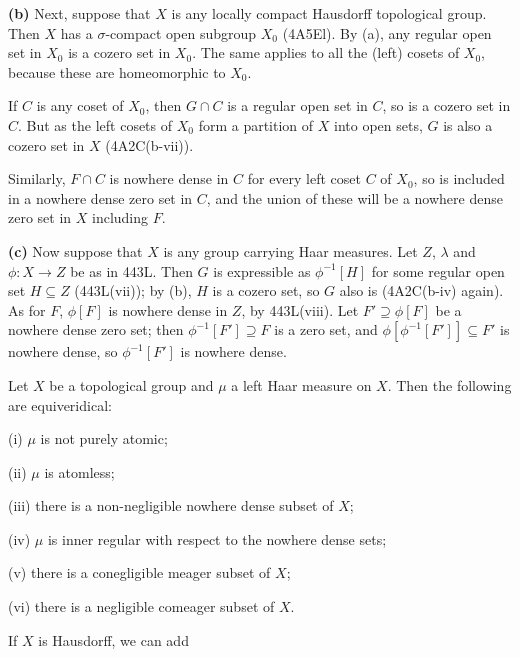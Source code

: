 {\medskip

{\bf (b)} Next, suppose that $X$ is any locally compact Hausdorff
topological group.   Then $X$ has a $\sigma$-compact open subgroup $X_0$
(4A5El).   By (a), any
regular open set in $X_0$ is a cozero set in $X_0$.   The same applies
to all the (left) cosets of $X_0$, because these are homeomorphic to
$X_0$.

If $C$ is any coset
of $X_0$, then $G\cap C$ is a regular open set in $C$, so is a cozero
set in $C$.   But as the left cosets of $X_0$ form a partition of $X$
into open sets, $G$ is also a cozero set in $X$ (4A2C(b-vii)).

Similarly, $F\cap C$ is nowhere dense in $C$ for every left coset $C$ of
$X_0$, so is included in a nowhere dense zero set in $C$, and the union
of these will be a nowhere dense zero set in $X$ including $F$.

\medskip

{\bf (c)} Now suppose that $X$ is any group carrying Haar
measures.   Let $Z$, $\lambda$ and $\phi:X\to Z$ be as in 443L.
Then $G$ is expressible as $\phi^{-1}[H]$ for some regular open set
$H\subseteq Z$ (443L(vii));  by (b), $H$ is a cozero set, so $G$ also is
(4A2C(b-iv) again).   As for $F$, $\phi[F]$ is nowhere dense
in $Z$, by 443L(viii).   Let $F'\supseteq\phi[F]$ be a nowhere dense zero
set;  then $\phi^{-1}[F']\supseteq F$ is a zero set, and
$\phi[\phi^{-1}[F']]\subseteq F'$ is nowhere dense, so $\phi^{-1}[F']$ is
nowhere dense.
}%

{} Let $X$ be a topological group and $\mu$ a left
Haar measure on $X$.   Then the following are equiveridical:

(i) $\mu$ is not purely atomic;

(ii) $\mu$ is atomless;

(iii) there is a non-negligible nowhere dense subset of $X$;

(iv) $\mu$ is inner regular with respect to the nowhere dense sets;

(v) there is a conegligible meager subset of $X$;

(vi) there is a negligible comeager subset of $X$.

\noindent If $X$ is Hausdorff, we can add

